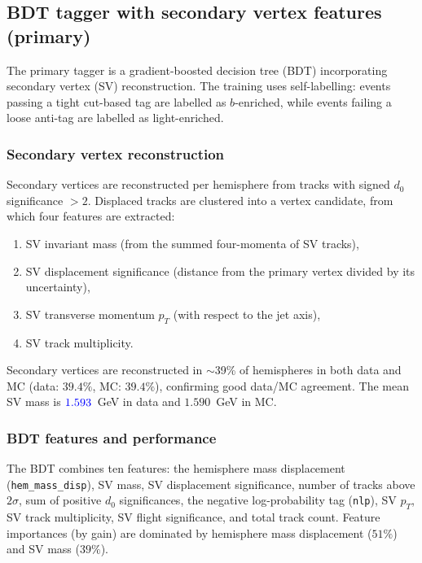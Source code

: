 \documentclass[11pt,a4paper]{article}
\newcommand{\measured}[1]{\textcolor{blue}{#1}}
\begin{document}
\subsection{BDT tagger with secondary vertex features (primary)}
\label{sec:tagging:bdt}

The primary tagger is a gradient-boosted decision tree (BDT)
incorporating secondary vertex (SV) reconstruction.
The training uses self-labelling: events passing a tight cut-based
tag are labelled as $b$-enriched, while events failing a loose
anti-tag are labelled as light-enriched.

\subsubsection{Secondary vertex reconstruction}
\label{sec:tagging:sv}

Secondary vertices are reconstructed per hemisphere from tracks with
signed $d_0$ significance $> 2$.
Displaced tracks are clustered into a vertex candidate, from which
four features are extracted:
\begin{enumerate}
\item SV invariant mass (from the summed four-momenta of SV tracks),
\item SV displacement significance (distance from the primary vertex
  divided by its uncertainty),
\item SV transverse momentum $p_T$ (with respect to the jet axis),
\item SV track multiplicity.
\end{enumerate}
Secondary vertices are reconstructed in $\sim$39\% of hemispheres
in both data and MC (data: $39.4\%$, MC: $39.4\%$), confirming
good data/MC agreement.
The mean SV mass is $\measured{1.593}$~GeV in data and
$1.590$~GeV in MC.

\subsubsection{BDT features and performance}

The BDT combines ten features: the hemisphere mass displacement
(\texttt{hem\_mass\_disp}), SV mass, SV displacement significance,
number of tracks above $2\sigma$, sum of positive $d_0$
significances, the negative log-probability tag (\texttt{nlp}),
SV $p_T$, SV track multiplicity, SV flight significance, and
total track count.
Feature importances (by gain) are dominated by
hemisphere mass displacement ($51\%$) and SV mass ($39\%$).
\end{document}
